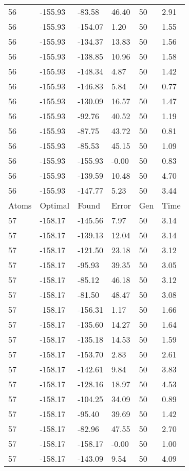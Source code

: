 \documentclass{report}
\begin{document}
\begin{appendix}
\begin{longtable}{llllll}
56 & -155.93 & -83.58 & 46.40 & 50 & 2.91 \\
56 & -155.93 & -154.07 & 1.20 & 50 & 1.55 \\
56 & -155.93 & -134.37 & 13.83 & 50 & 1.56 \\
56 & -155.93 & -138.85 & 10.96 & 50 & 1.58 \\
56 & -155.93 & -148.34 & 4.87 & 50 & 1.42 \\
56 & -155.93 & -146.83 & 5.84 & 50 & 0.77 \\
56 & -155.93 & -130.09 & 16.57 & 50 & 1.47 \\
56 & -155.93 & -92.76 & 40.52 & 50 & 1.19 \\
56 & -155.93 & -87.75 & 43.72 & 50 & 0.81 \\
56 & -155.93 & -85.53 & 45.15 & 50 & 1.09 \\
56 & -155.93 & -155.93 & -0.00 & 50 & 0.83 \\
56 & -155.93 & -139.59 & 10.48 & 50 & 4.70 \\
56 & -155.93 & -147.77 & 5.23 & 50 & 3.44 \\
Atoms & Optimal & Found & Error & Gen & Time \\
57 & -158.17 & -145.56 & 7.97 & 50 & 3.14 \\
57 & -158.17 & -139.13 & 12.04 & 50 & 3.14 \\
57 & -158.17 & -121.50 & 23.18 & 50 & 3.12 \\
57 & -158.17 & -95.93 & 39.35 & 50 & 3.05 \\
57 & -158.17 & -85.12 & 46.18 & 50 & 3.12 \\
57 & -158.17 & -81.50 & 48.47 & 50 & 3.08 \\
57 & -158.17 & -156.31 & 1.17 & 50 & 1.66 \\
57 & -158.17 & -135.60 & 14.27 & 50 & 1.64 \\
57 & -158.17 & -135.18 & 14.53 & 50 & 1.59 \\
57 & -158.17 & -153.70 & 2.83 & 50 & 2.61 \\
57 & -158.17 & -142.61 & 9.84 & 50 & 3.83 \\
57 & -158.17 & -128.16 & 18.97 & 50 & 4.53 \\
57 & -158.17 & -104.25 & 34.09 & 50 & 0.89 \\
57 & -158.17 & -95.40 & 39.69 & 50 & 1.42 \\
57 & -158.17 & -82.96 & 47.55 & 50 & 2.70 \\
57 & -158.17 & -158.17 & -0.00 & 50 & 1.00 \\
57 & -158.17 & -143.09 & 9.54 & 50 & 4.09 \\

\end{longtable}
\end{appendix}
\end{document}
